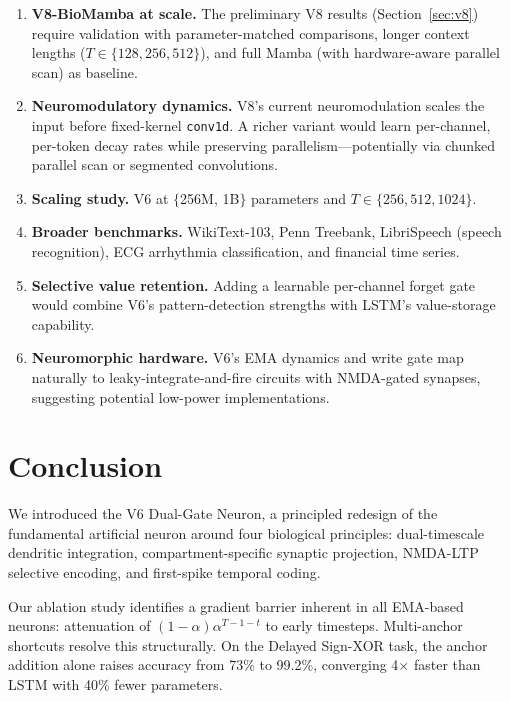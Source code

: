 \documentclass[11pt,a4paper]{article}
\begin{document}
\begin{enumerate}[leftmargin=*, label=(\arabic*), noitemsep]

\item \textbf{V8-BioMamba at scale.}
  The preliminary V8 results (Section~\ref{sec:v8}) require validation
  with parameter-matched comparisons, longer context lengths
  ($T \in \{128, 256, 512\}$), and full Mamba (with hardware-aware
  parallel scan) as baseline.

\item \textbf{Neuromodulatory dynamics.}
  V8's current neuromodulation scales the input before fixed-kernel
  \texttt{conv1d}. A richer variant would learn per-channel, per-token
  decay rates while preserving parallelism---potentially via
  chunked parallel scan or segmented convolutions.

\item \textbf{Scaling study.}
  V6 at $\{$256M, 1B$\}$ parameters and $T\in\{256, 512, 1024\}$.

\item \textbf{Broader benchmarks.}
  WikiText-103, Penn Treebank, LibriSpeech (speech recognition),
  ECG arrhythmia classification, and financial time series.

\item \textbf{Selective value retention.}
  Adding a learnable per-channel forget gate would combine V6's
  pattern-detection strengths with LSTM's value-storage capability.

\item \textbf{Neuromorphic hardware.}
  V6's EMA dynamics and write gate map naturally to
  leaky-integrate-and-fire circuits with NMDA-gated synapses,
  suggesting potential low-power implementations.

\end{enumerate}

\section{Conclusion}

We introduced the V6 Dual-Gate Neuron, a principled redesign of the
fundamental artificial neuron around four biological principles:
dual-timescale dendritic integration, compartment-specific synaptic
projection, NMDA-LTP selective encoding, and first-spike temporal coding.

Our ablation study identifies a gradient barrier inherent in all EMA-based
neurons: attenuation of $(1-\alpha)\alpha^{T-1-t}$ to early timesteps.
Multi-anchor shortcuts resolve this structurally.
On the Delayed Sign-XOR task, the anchor addition alone raises accuracy
from 73\% to 99.2\%, converging 4$\times$ faster than LSTM with 40\%
fewer parameters.
\end{document}

